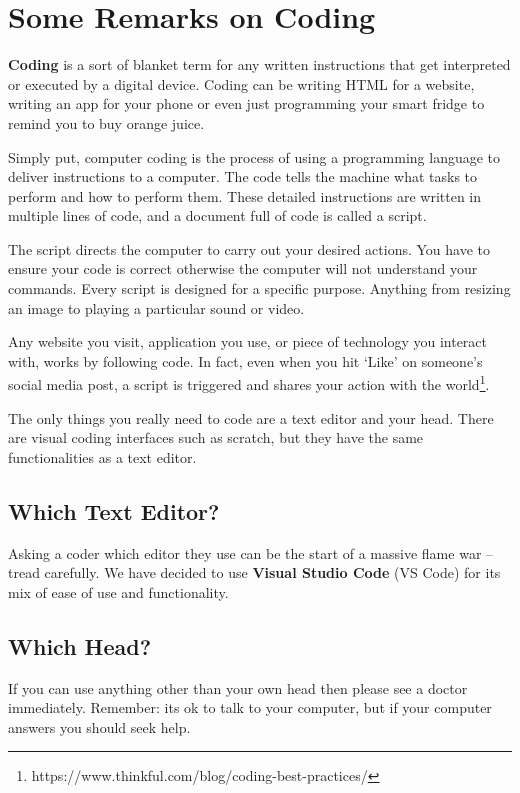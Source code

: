 \documentclass[english,11pt,a4paper]{report}
\newcommand{\bfb}[1]{{\bf \color{blue} #1}}
\begin{document}
\section{Some Remarks on Coding}
\bfb{Coding} is a sort of blanket term for any written instructions that get interpreted or executed by a digital device. Coding can be writing HTML for a website, writing an app for your phone or even just programming your smart fridge to remind you to buy orange juice.

Simply put, computer coding is the process of using a programming language to deliver instructions to a computer. The code tells the machine what tasks to perform and how to perform them. These detailed instructions are written in multiple lines of code, and a document full of code is called a script.

The script directs the computer to carry out your desired actions. You have to ensure your code is correct otherwise the computer will not understand your commands. Every script is designed for a specific purpose. Anything from resizing an image to playing a particular sound or video.

Any website you visit, application you use, or piece of technology you interact with, works by following code. In fact, even when you hit ‘Like’ on someone’s social media post, a script is triggered and shares your action with the world\footnote{https://www.thinkful.com/blog/coding-best-practices/}.

The only things you really need to code are a text editor and your head. There are visual coding interfaces such as scratch, but they have the same functionalities as a text editor.

\subsection{Which Text Editor?}

Asking a coder which editor they use can be the start of a massive flame war -- tread carefully.  We have decided to use \bfb{Visual Studio Code} (VS Code) for its mix of ease of use and functionality. 

\subsection{Which Head?}

If you can use anything other than your own head then please see a doctor immediately. Remember: its ok to talk to your computer, but if your computer answers you should seek help.
\end{document}

